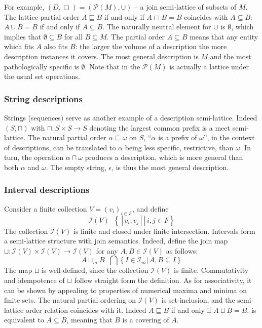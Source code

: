 \documentclass[a4paper]{article}
\newcommand{\obj}[1]{{\left\{ #1 \right \}}}
\newcommand{\clo}[1]{{\left [ #1 \right ]}}
\newcommand{\brac}[1]{{\left ( #1 \right )}}
\newcommand{\induc}[1]{{\left . #1 \right \vert}}
\newcommand{\Pwr}{\mathcal{P}}
\newcommand{\Ical}{\mathcal{I}}
\newcommand{\defn}{\mathop{\overset{\Delta}{=}}\nolimits}
\begin{document}
For example, $(D,\Box) = \brac{\Pwr(M), \cup}$ -- a join semi-lattice of subsets of $M$. The lattice partial order $A\sqsubseteq B$ if and only if $A\Box B = B$ coincides with $A\subseteq B$: $A\cup B = B$ if and only if $A\subseteq B$. The naturally neutral element for $\cup$ is $\emptyset$, which implies that $\emptyset\subseteq B$ for all $B\subseteq M$. The partial order $A\subseteq B$ means that any entity which fits $A$ also fits $B$: the larger the volume of a description the more description instances it covers. The most general description is $M$ and the most pathologically specific is $\emptyset$. Note that in the $\Pwr(M)$ is actually a lattice under the usual set operations.


\subsubsection*{String descriptions} %
\label{ssub:string_descriptions}

Strings (sequences) serve as another example of a description semi-lattice. Indeed $\brac{S,\sqcap}$ with $\sqcap:S\times S\to S$ denoting the largest common prefix is a meet semi-lattice. The natural partial order $\alpha\sqsubseteq\omega$ on $S$, ``$\alpha$ is a prefix of $\omega$'', in the context of descriptions, can be translated to $\alpha$ being less specific, restrictive, than $\omega$. In turn, the operation $\alpha\sqcap\omega$ produces a description, which is more general than both $\alpha$ and $\omega$. The empty string, $\epsilon$, is thus the most general description.


\subsubsection*{Interval descriptions} %
\label{ssub:interval_descriptions}

Consider a finite collection $V = \brac{v_i}_{i\in F}$, and define \[\Ical(V) \defn \obj{ \induc{ \clo{v_i, v_j} }\, i,j\in F}\] The collection $\Ical(V)$ is finite and closed under finite intersection. Intervals form a semi-lattice structure with join semantics. Indeed, define the join map $\sqcup:\Ical(V)\times\Ical(V)\to\Ical(V)$ for any $A,B\in\Ical(V)$ as follows: \[A\sqcup_m B \defn \bigcap\obj{ \induc{ I\in \mathcal{I}_m }\,A,B\subseteq I }\] The map $\sqcup$ is well-defined, since the collection $\Ical(V)$ is finite. Commutativity and idempotence of $\sqcup$ follow straight form the definition. As for associativity, it can be shown by appealing to properties of numerical maxima and minima on finite sets. The natural partial ordering on $\Ical(V)$ is set-inclusion, and the semi-lattice order relation coincides with it. Indeed $A\sqsubseteq B$ if and only if $A\sqcup B = B$, is equivalent to $A\subseteq B$, meaning that $B$ is a covering of $A$.
\end{document}
